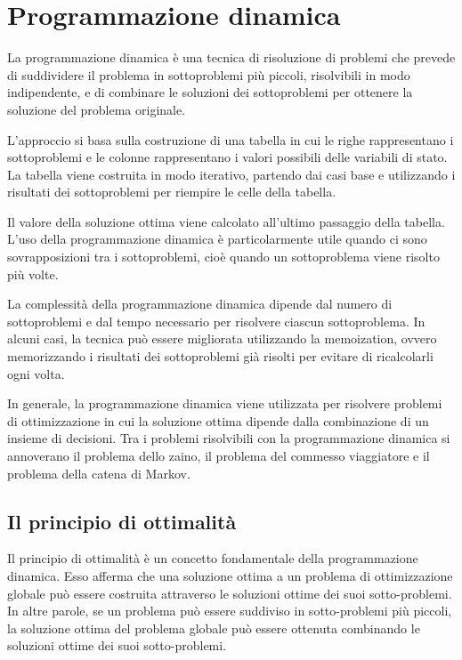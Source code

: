 \chapter{Programmazione dinamica}


La programmazione dinamica è una tecnica di risoluzione di problemi che prevede di suddividere il problema in sottoproblemi più piccoli, risolvibili in modo indipendente, e di combinare le soluzioni dei sottoproblemi per ottenere la soluzione del problema originale.

L'approccio si basa sulla costruzione di una tabella in cui le righe rappresentano i sottoproblemi e le colonne rappresentano i valori possibili delle variabili di stato. La tabella viene costruita in modo iterativo, partendo dai casi base e utilizzando i risultati dei sottoproblemi per riempire le celle della tabella.

Il valore della soluzione ottima viene calcolato all'ultimo passaggio della tabella. L'uso della programmazione dinamica è particolarmente utile quando ci sono sovrapposizioni tra i sottoproblemi, cioè quando un sottoproblema viene risolto più volte.

La complessità della programmazione dinamica dipende dal numero di sottoproblemi e dal tempo necessario per risolvere ciascun sottoproblema. In alcuni casi, la tecnica può essere migliorata utilizzando la memoization, ovvero memorizzando i risultati dei sottoproblemi già risolti per evitare di ricalcolarli ogni volta.

In generale, la programmazione dinamica viene utilizzata per risolvere problemi di ottimizzazione in cui la soluzione ottima dipende dalla combinazione di un insieme di decisioni. Tra i problemi risolvibili con la programmazione dinamica si annoverano il problema dello zaino, il problema del commesso viaggiatore e il problema della catena di Markov.

\section{Il principio di ottimalità}
Il principio di ottimalità è un concetto fondamentale della programmazione dinamica. Esso afferma che una soluzione ottima a un problema di ottimizzazione globale può essere costruita attraverso le soluzioni ottime dei suoi sotto-problemi. In altre parole, se un problema può essere suddiviso in sotto-problemi più piccoli, la soluzione ottima del problema globale può essere ottenuta combinando le soluzioni ottime dei suoi sotto-problemi.

